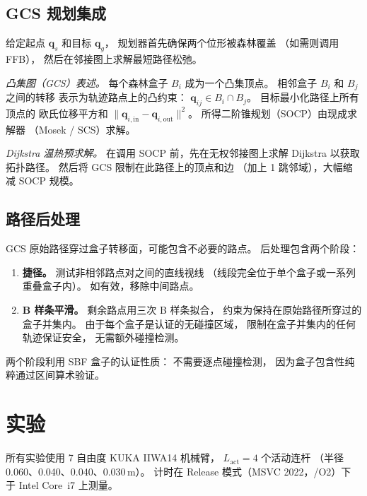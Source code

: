 \documentclass[journal]{IEEEtran}
\begin{document}
\subsection{GCS 规划集成}\label{sec:gcs_planning}

给定起点 $\bm{q}_s$ 和目标 $\bm{q}_g$，
规划器首先确保两个位形被森林覆盖
（如需则调用 FFB），
然后在邻接图上求解最短路径松弛。

\emph{凸集图（GCS）表述。}
每个森林盒子 $B_i$ 成为一个凸集顶点。
相邻盒子 $B_i$ 和 $B_j$ 之间的转移
表示为轨迹路点上的凸约束：
$\bm{q}_{ij} \in B_i \cap B_j$。
目标最小化路径上所有顶点的
欧氏位移平方和
$\|\bm{q}_{i,\text{in}} - \bm{q}_{i,\text{out}}\|^2$。
所得二阶锥规划（SOCP）由现成求解器
（Mosek / SCS）求解。

\emph{Dijkstra 温热预求解。}
在调用 SOCP 前，先在无权邻接图上求解 Dijkstra
以获取拓扑路径。
然后将 GCS 限制在此路径上的顶点和边
（加上 1 跳邻域），大幅缩减 SOCP 规模。

\subsection{路径后处理}\label{sec:post_process}

GCS 原始路径穿过盒子转移面，可能包含不必要的路点。
后处理包含两个阶段：
\begin{enumerate}
  \item \textbf{捷径。}
    测试非相邻路点对之间的直线视线
    （线段完全位于单个盒子或一系列重叠盒子内）。
    如有效，移除中间路点。
  \item \textbf{B 样条平滑。}
    剩余路点用三次 B 样条拟合，
    约束为保持在原始路径所穿过的盒子并集内。
    由于每个盒子是认证的无碰撞区域，
    限制在盒子并集内的任何轨迹保证安全，
    无需额外碰撞检测。
\end{enumerate}
两个阶段利用 SBF 盒子的认证性质：
不需要逐点碰撞检测，
因为盒子包含性纯粹通过区间算术验证。

\section{实验}\label{sec:experiments}


所有实验使用 7 自由度 KUKA IIWA14 机械臂，
$L_\text{act}{=}4$ 个活动连杆
（半径 0.060、0.040、0.040、0.030\,m）。
计时在 Release 模式（MSVC 2022，/O2）下
于 Intel Core~i7 上测量。
\end{document}
